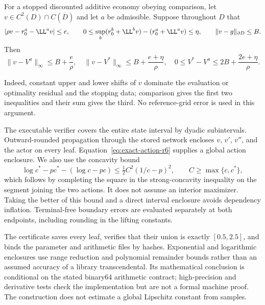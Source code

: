 \begin{proposition}\label{prop:stopped-r6}
For a stopped discounted additive economy obeying comparison, let $v\in C^2(D)\cap C(\overline D)$ and let $a$ be admissible. Suppose throughout $D$ that
\[
 |\rho v-r_0^a-\LL^av|\leq e,\qquad
 0\leq\sup_b(r_0^b+\LL^bv)-(r_0^a+\LL^av)\leq\eta,
 \qquad\|v-g\|_{\partial D}\leq B.
\]
Then
\begin{equation}\label{eq:stopped-bounds-r6}
 \|v-V^a\|_\infty\leq B+\frac e\rho,\quad
 \|v-V^*\|_\infty\leq B+\frac{e+\eta}\rho,\quad
 0\leq V^*-V^a\leq2B+\frac{2e+\eta}\rho.
\end{equation}
\end{proposition}
Indeed, constant upper and lower shifts of $v$ dominate the evaluation or optimality residual and the stopping data; comparison gives the first two inequalities and their sum gives the third. No reference-grid error is used in this argument.

The executable verifier covers the entire state interval by dyadic subintervals. Outward-rounded propagation through the stored network encloses $v$, $v'$, $v''$, and the actor on every leaf. Equation~\eqref{eq:exact-action-r6} supplies a global action enclosure. We also use the concavity bound
\begin{equation}\label{eq:concavity-gap-r6}
 \log c^*-pc^*-(\log c-pc)
 \leq \tfrac12 C^2(1/c-p)^2,\qquad C\geq\max\{c,c^*\},
\end{equation}
which follows by completing the square in the strong-concavity inequality on the segment joining the two actions. It does not assume an interior maximizer. Taking the better of this bound and a direct interval enclosure avoids dependency inflation. Terminal-free boundary errors are evaluated separately at both endpoints, including rounding in the lifting constants.

The certificate saves every leaf, verifies that their union is exactly $[0.5,2.5]$, and binds the parameter and arithmetic files by hashes. Exponential and logarithmic enclosures use range reduction and polynomial remainder bounds rather than an assumed accuracy of a library transcendental. Its mathematical conclusion is conditional on the stated binary64 arithmetic contract; high-precision and derivative tests check the implementation but are not a formal machine proof. The construction does not estimate a global Lipschitz constant from samples.

